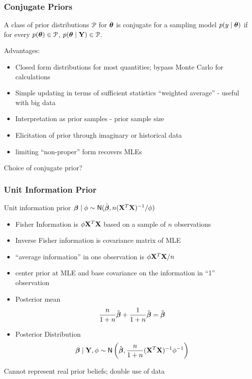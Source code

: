 \documentclass[handout]{beamer}\usepackage[]{graphicx}\usepackage[]{color}
\begin{document}
\begin{frame}
  \frametitle{Conjugate Priors}
  \begin{definition}
    A class of prior distributions ${\cal{P}}$ for $\boldsymbol{\theta}$ is conjugate for a
    sampling model $p(y \mid \boldsymbol{\theta})$ if for every $p(\boldsymbol{\theta}) \in {\cal{P}}$, $p(\boldsymbol{\theta}
    \mid \mathbf{Y}) \in {\cal{P}}$.
  \end{definition}
\pause
  Advantages: \pause
  \begin{itemize}
  \item Closed form distributions for most quantities; bypass Monte Carlo for
    calculations \pause
  \item Simple updating in terms of sufficient statistics ``weighted
    average'' - useful with big data \pause
  \item Interpretation as prior samples - prior sample size \pause
  \item Elicitation of prior through imaginary or historical data \pause
  \item limiting ``non-proper'' form recovers MLEs \pause
  \end{itemize}
Choice of conjugate prior?
\end{frame}

\begin{frame}
  \frametitle{Unit Information Prior}

Unit information prior $\boldsymbol{\beta} \mid \phi \sim \textsf{N}(\hat{\boldsymbol{\beta}}, n
   (\mathbf{X}^T\mathbf{X})^{-1}/\phi)$ \pause
  \begin{itemize}
\item Fisher Information is $\phi \mathbf{X}^T\mathbf{X}$ based on a sample of $n$
  observations \pause
\item Inverse Fisher information is covariance matrix of MLE \pause
\item ``average information'' in one observation is  $\phi \mathbf{X}^T\mathbf{X} /n$ \pause
\item center prior at MLE and base covariance on the information in
  ``1'' observation \pause
\item  Posterior mean
$$\frac{n}{1 + n} \hat{\boldsymbol{\beta}} +  \frac{1}{1 + n}\hat{\boldsymbol{\beta}} = \hat{\boldsymbol{\beta}}$$ \pause
\item Posterior Distribution
$$\boldsymbol{\beta} \mid \mathbf{Y}, \phi \sim \textsf{N}\left( \hat{\boldsymbol{\beta}}, \frac{n}{1 + n} (\mathbf{X}^T\mathbf{X})^{-1}
  \phi^{-1} \right)$$ \pause
    \end{itemize}
Cannot represent real prior beliefs; double use of data
\end{frame}
\end{document}
